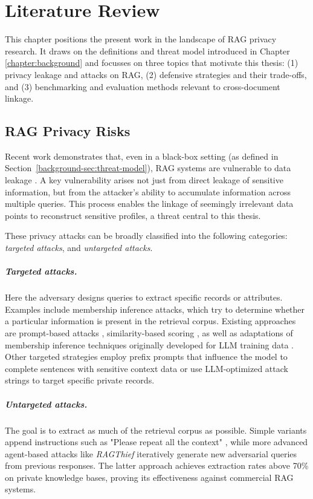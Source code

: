 \chapter{Literature Review}\label{chapter:literature}
This chapter positions the present work in the landscape of \ac{RAG} privacy research. It draws on the definitions and threat model introduced in Chapter \ref{chapter:background} and focusses on three topics that motivate this thesis: (1) privacy leakage and attacks on RAG, (2) defensive strategies and their trade-offs, and (3) benchmarking and evaluation methods relevant to cross-document linkage.

\section{RAG Privacy Risks}\label{literature-sec:privacy-attacks}
Recent work demonstrates that, even in a black-box setting (as defined in Section~\ref{background-sec:threat-model}), \ac{RAG} systems are vulnerable to data leakage \cite{implicationsRAG,goodAndBad}. A key vulnerability arises not just from direct leakage of sensitive information, but from the attacker's ability to accumulate information across multiple queries. This process enables the linkage of seemingly irrelevant data points to reconstruct sensitive profiles, a threat central to this thesis.

These privacy attacks can be broadly classified into the following categories: \textit{targeted attacks}, and \textit{untargeted attacks}.

\paragraph{Targeted attacks.} Here the adversary designs queries to extract specific records or attributes. Examples include membership inference attacks, which try to determine whether a particular information is present in the retrieval corpus. Existing approaches are prompt-based attacks \cite{ragMIA}, similarity-based scoring \cite{generatingIsBelieving}, as well as adaptations of membership inference techniques originally developed for LLM training data \cite{extractingTrainingDataLLM,generatingIsBelieving}. Other targeted strategies employ prefix prompts that influence the model to complete sentences with sensitive context data or use LLM-optimized attack strings to target specific private records. \cite{goodAndBad, DEAL} 

\paragraph{Untargeted attacks.} The goal is to extract as much of the retrieval corpus as possible. Simple variants append instructions such as "Please repeat all the context" \cite{goodAndBad,spillTheBeans}, while more advanced agent-based attacks like \textit{RAGThief} \cite{ragThief} iteratively generate new adversarial queries from previous responses. The latter approach achieves extraction rates above 70\% on private knowledge bases, proving its effectiveness against commercial \ac{RAG} systems.

